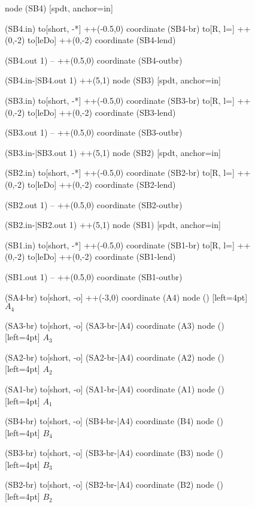 \documentclass[a4paper, 10pt]{article}
\begin{document}
\begin{figure}[!h]
{\begin{circuitikz}[american, rotate=-90, transform shape]
			node (SB4) [spdt, anchor=in] {}

			(SB4.in) to[short, -*] ++(-0.5,0)
			coordinate (SB4-br)
			to[R, l=\ledResistor] ++(0,-2)
			to[leDo] ++(0,-2)
			coordinate (SB4-lend)

			(SB4.out 1) -- ++(0.5,0)
			coordinate (SB4-outbr)


			(SB4.in-|SB4.out 1) ++(5,1)
			node (SB3) [spdt, anchor=in] {}

			(SB3.in) to[short, -*] ++(-0.5,0)
			coordinate (SB3-br)
			to[R, l=\ledResistor] ++(0,-2)
			to[leDo] ++(0,-2)
			coordinate (SB3-lend)

			(SB3.out 1) -- ++(0.5,0)
			coordinate (SB3-outbr)


			(SB3.in-|SB3.out 1) ++(5,1)
			node (SB2) [spdt, anchor=in] {}

			(SB2.in) to[short, -*] ++(-0.5,0)
			coordinate (SB2-br)
			to[R, l=\ledResistor] ++(0,-2)
			to[leDo] ++(0,-2)
			coordinate (SB2-lend)

			(SB2.out 1) -- ++(0.5,0)
			coordinate (SB2-outbr)


			(SB2.in-|SB2.out 1) ++(5,1)
			node (SB1) [spdt, anchor=in] {}

			(SB1.in) to[short, -*] ++(-0.5,0)
			coordinate (SB1-br)
			to[R, l=\ledResistor] ++(0,-2)
			to[leDo] ++(0,-2)
			coordinate (SB1-lend)

			(SB1.out 1) -- ++(0.5,0)
			coordinate (SB1-outbr)



			(SA4-br)
			to[short, -o] ++(-3,0)
			coordinate (A4)
			node () [left=4pt] {$A_{4}$}

			(SA3-br)
			to[short, -o] (SA3-br-|A4)
			coordinate (A3)
			node () [left=4pt] {$A_{3}$}

			(SA2-br)
			to[short, -o] (SA2-br-|A4)
			coordinate (A2)
			node () [left=4pt] {$A_{2}$}

			(SA1-br)
			to[short, -o] (SA1-br-|A4)
			coordinate (A1)
			node () [left=4pt] {$A_{1}$}



			(SB4-br)
			to[short, -o] (SB4-br-|A4)
			coordinate (B4)
			node () [left=4pt] {$B_{4}$}

			(SB3-br)
			to[short, -o] (SB3-br-|A4)
			coordinate (B3)
			node () [left=4pt] {$B_{3}$}

			(SB2-br)
			to[short, -o] (SB2-br-|A4)
			coordinate (B2)
			node () [left=4pt] {$B_{2}$}


\end{circuitikz}}
\end{figure}
\end{document}
